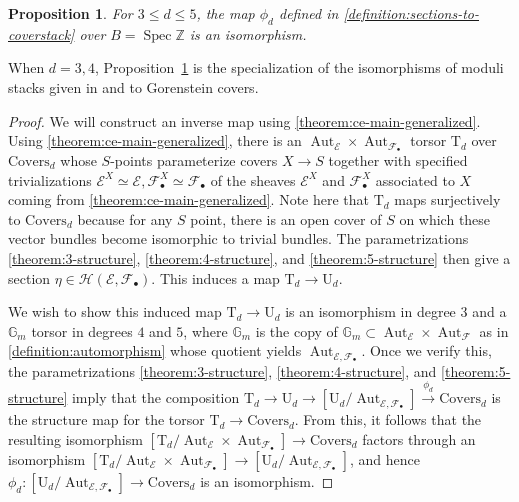 \documentclass[12 pt]{amsart}
\theoremstyle{plain}
\newtheorem{proposition}[theorem]{Proposition}
\theoremstyle{definition}
\theoremstyle{remark}
\numberwithin{equation}{section}
\newcommand\bg{\mathbb G}
\newcommand\bz{\mathbb Z}
\newcommand\sce{\mathscr E}
\newcommand\scf{\mathscr F}
\newcommand\sch{\mathscr H}
\DeclareMathOperator\spec{\operatorname{Spec}}
\newcommand\coverstack[1]{\mathrm{Covers}_{d}} %
\newcommand\auttorsor[1]{\mathrm{T}_{d}} %
\newcommand\gorensteinsections[1]{\mathrm{U}_{d}} %
\DeclareMathOperator\aut{Aut}
\begin{document}
\begin{proposition} \label{proposition:ce-as-quotient-stack} For $3 \leq d \leq
5$, the map $\phi_d$ defined in \autoref{definition:sections-to-coverstack} over
$B = \spec \bz$ is an isomorphism.  \end{proposition}

When $d=3,4$, Proposition~\ref{proposition:ce-as-quotient-stack} is the specialization of the isomorphisms of moduli stacks given in \cite[Prop.\ 5.1]{Poonen2008} and \cite[Thm.\ 1.1]{Wood2011}
 to Gorenstein covers.

\begin{proof}
	We will construct an inverse map using
	\autoref{theorem:ce-main-generalized}.  Using
	\autoref{theorem:ce-main-generalized}, there is an $\aut_{\sce} \times
	\aut_{\scf_\bullet}$ torsor $\auttorsor d$ over $\coverstack d$
	whose $S$-points parameterize covers $X \to S$ together with specified
	trivializations $\sce^X \simeq \sce, \scf_\bullet^X \simeq \scf_\bullet$
	of the sheaves $\sce^X$ and $\scf^X_\bullet$ associated to $X$ coming
	from \autoref{theorem:ce-main-generalized}.  
	Note here that $\auttorsor d$ maps surjectively to $\coverstack d$ because
	for any $S$ point, there is an open cover of $S$ on which these vector
	bundles become isomorphic to trivial bundles.
	The parametrizations
	\autoref{theorem:3-structure}, \autoref{theorem:4-structure}, and
	\autoref{theorem:5-structure} then give a section $\eta \in \sch(\sce,
\scf_\bullet)$.  This induces a map $\auttorsor d \to \gorensteinsections d$.

	We wish to show this induced map 
	$\auttorsor d \to \gorensteinsections d$
	is an isomorphism in degree $3$ and a
	$\bg_m$ torsor in degrees $4$ and $5$, where $\bg_m$ is the copy of
	$\bg_m \subset \aut_{\sce} \times \aut_{\scf}$ 
	as in \autoref{definition:automorphism}	
	whose quotient yields
	$\aut_{\sce, \scf_\bullet}$.  Once we verify this, the parametrizations
	\autoref{theorem:3-structure}, \autoref{theorem:4-structure}, and
	\autoref{theorem:5-structure} imply that the composition 
	$\auttorsor d \to \gorensteinsections d \to [\gorensteinsections
d/\aut_{\sce, \scf_\bullet}] \xrightarrow{\phi_d} \coverstack d$
is the structure map for the torsor $\auttorsor d \to
	\coverstack d$.  
	From this, it follows that the resulting
	isomorphism
	$[\auttorsor d/
	\aut_\sce \times \aut_{\scf_\bullet}] \to \coverstack d$ 
	factors through an isomorphism
	$[\auttorsor d/	\aut_\sce \times \aut_{\scf_\bullet}] \to
	[\gorensteinsections d/\aut_{\sce, \scf_\bullet}]$, and hence
	$\phi_d: [\gorensteinsections d/\aut_{\sce, \scf_\bullet}] \to
	\coverstack d$
	is an
	isomorphism.


\end{proof}
\end{document}
